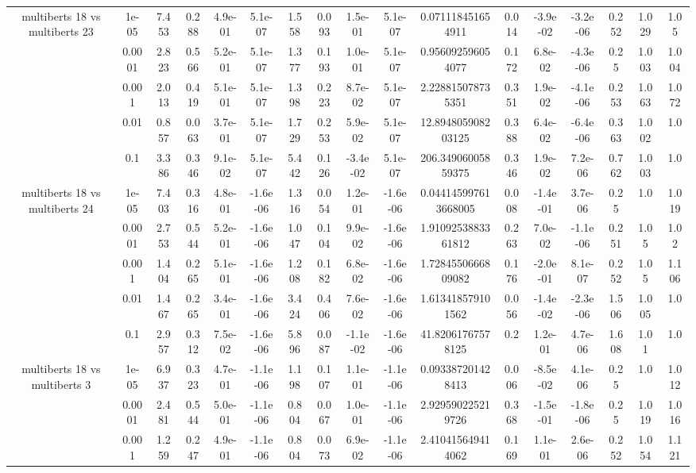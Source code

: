 \begin{tabular}{|c|c|c|c|c|c|c|c|c|c|c|c|c|c|c|c|c|}
\hline
\multirow{5}{*}{multiberts 18 vs multiberts 23} & 1e-05 & 7.453 & 0.288 & 4.9e-01 & 5.1e-07 & 1.558 & 0.093 & 1.5e-01 & 5.1e-07 & 0.071118451654911 & 0.014 & -3.9e-02 & -3.2e-06 & 0.252 & 1.029 & 1.05 \\
 & 0.0001 & 2.823 & 0.566 & 5.2e-01 & 5.1e-07 & 1.377 & 0.193 & 1.0e-01 & 5.1e-07 & 0.956092596054077 & 0.172 & 6.8e-02 & -4.3e-06 & 0.25 & 1.003 & 1.004 \\
 & 0.001 & 2.013 & 0.419 & 5.1e-01 & 5.1e-07 & 1.398 & 0.223 & 8.7e-02 & 5.1e-07 & 2.228815078735351 & 0.351 & 1.9e-02 & -4.1e-06 & 0.253 & 1.063 & 1.072 \\
 & 0.01 & 0.857 & 0.063 & 3.7e-01 & 5.1e-07 & 1.729 & 0.253 & 5.9e-02 & 5.1e-07 & 12.894805908203125 & 0.388 & 6.4e-02 & -6.4e-06 & 0.363 & 1.002 & 1.0 \\
 & 0.1 & 3.386 & 0.346 & 9.1e-02 & 5.1e-07 & 5.442 & 0.126 & -3.4e-02 & 5.1e-07 & 206.34906005859375 & 0.346 & 1.9e-02 & 7.2e-06 & 0.762 & 1.003 & 1.0 \\
\hline
\multirow{5}{*}{multiberts 18 vs multiberts 24} & 1e-05 & 7.403 & 0.316 & 4.8e-01 & -1.6e-06 & 1.316 & 0.054 & 1.2e-01 & -1.6e-06 & 0.044145997613668005 & 0.008 & -1.4e-01 & 3.7e-06 & 0.25 & 1.0 & 1.019 \\
 & 0.0001 & 2.753 & 0.544 & 5.2e-01 & -1.6e-06 & 1.047 & 0.104 & 9.9e-02 & -1.6e-06 & 1.9109253883361812 & 0.263 & 7.0e-02 & -1.1e-06 & 0.251 & 1.05 & 1.02 \\
 & 0.001 & 1.404 & 0.265 & 5.1e-01 & -1.6e-06 & 1.208 & 0.182 & 6.8e-02 & -1.6e-06 & 1.7284550666809082 & 0.176 & -2.0e-01 & 8.1e-07 & 0.252 & 1.05 & 1.106 \\
 & 0.01 & 1.467 & 0.265 & 3.4e-01 & -1.6e-06 & 3.424 & 0.406 & 7.6e-02 & -1.6e-06 & 1.613418579101562 & 0.056 & -1.4e-02 & -2.3e-06 & 1.506 & 1.005 & 1.0 \\
 & 0.1 & 2.957 & 0.312 & 7.5e-02 & -1.6e-06 & 5.896 & 0.087 & -1.1e-02 & -1.6e-06 & 41.82061767578125 & 0.2 & 1.2e-01 & 4.7e-06 & 1.608 & 1.01 & 1.0 \\
\hline
\multirow{5}{*}{multiberts 18 vs multiberts 3} & 1e-05 & 6.937 & 0.323 & 4.7e-01 & -1.1e-06 & 1.198 & 0.107 & 1.1e-01 & -1.1e-06 & 0.093387201428413 & 0.006 & -8.5e-02 & 4.1e-06 & 0.25 & 1.0 & 1.012 \\
 & 0.0001 & 2.481 & 0.544 & 5.0e-01 & -1.1e-06 & 0.804 & 0.067 & 1.0e-01 & -1.1e-06 & 2.929590225219726 & 0.368 & -1.5e-01 & -1.8e-06 & 0.25 & 1.019 & 1.016 \\
 & 0.001 & 1.259 & 0.247 & 4.9e-01 & -1.1e-06 & 0.804 & 0.073 & 6.9e-02 & -1.1e-06 & 2.410415649414062 & 0.169 & 1.1e-01 & 2.6e-06 & 0.252 & 1.054 & 1.121 \\

\end{tabular}
